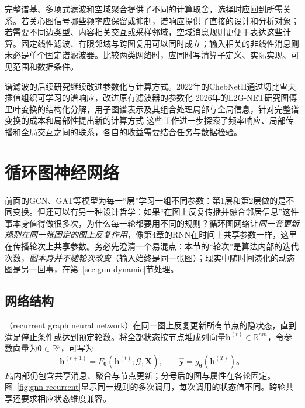 完整谱基、多项式滤波和空域聚合提供了不同的计算取舍，选择时应回到所需关系。若关心图信号哪些频率应保留或抑制，谱响应提供了直接的设计和分析对象；若需要不同边类型、内容相关交互或采样邻域，空域消息规则更便于表达这些计算。固定线性滤波、有限邻域与跨图复用可以同时成立；输入相关的非线性消息则未必是单个固定谱滤波器。比较两类网络时，应同时写清算子定义、实际实现、可见范围和数据条件。

谱滤波的后续研究继续改进参数化与计算方式。2022年的ChebNetII通过切比雪夫插值组织可学习的谱响应，改进原有滤波器的参数化 2026年的L2G-NET研究图傅里叶变换的结构化分解，用子图谱表示及其组合处理局部与全局信息，针对完整谱变换的成本和局部性提出新的计算方式 这些工作进一步探索了频率响应、局部传播和全局交互之间的联系，各自的收益需要结合任务与数据检验。

\section{循环图神经网络}
\label{sec:gnn-recurrent}

前面的GCN、GAT等模型为每一“层”学习一组不同参数：第1层和第2层做的是不同变换。但还可以有另一种设计哲学：如果“在图上反复传播并融合邻居信息”这件事本身值得做很多次，为什么每一轮都要用不同的规则？循环图网络让\emph{同一套更新规则在同一张固定的图上反复作用}，像第4章的RNN在时间上共享参数一样，这里在传播轮次上共享参数。务必先澄清一个易混点：本节的“轮次”是算法内部的迭代次数，\emph{图本身并不随轮次改变}（输入始终是同一张图）；现实中随时间演化的动态图是另一回事，在第~\ref{sec:gnn-dynamic}节处理。

\subsection{网络结构}
\label{sec:gnn-recurrent-structure}

（recurrent graph neural network）在同一图上反复更新所有节点的隐状态，直到满足停止条件或达到预定轮数。将全部状态按节点堆成列向量$\bm{h}^{(t)}\in\mathbb{R}^{nm}$，令参数向量为$\bm{\theta}\in\mathbb{R}^{p}$，可写为
\begin{equation}
  \bm{h}^{(t+1)}=F_{\bm{\theta}}(\bm{h}^{(t)};\mathcal{G},\bm{X}),
  \qquad \widehat{\bm{y}}=g_{\bm{\theta}}(\bm{h}^{(T)})\text{。}
  \label{eq:gnn-recurrent-update}
\end{equation}
$F_{\bm{\theta}}$内部仍包含共享消息、聚合与节点更新；分号后的图与属性在各轮固定。图~\ref{fig:gnn-recurrent}显示同一规则的多次调用，每次调用的状态值不同。跨轮共享还要求相应状态维度兼容。

